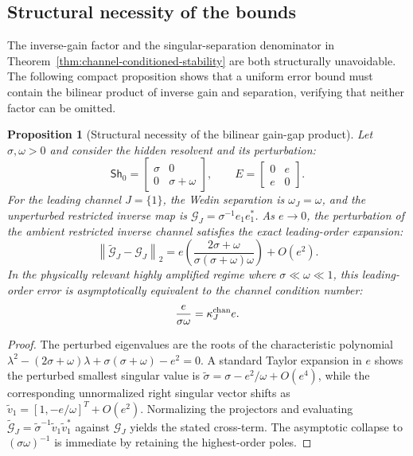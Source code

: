 \documentclass[review]{siamart220329}
\newtheorem{proposition}[theorem]{Proposition}
\theoremstyle{definition}
\theoremstyle{remark}
\newcommand{\Sh}{\mathsf{Sh}}
\newcommand{\norm}[1]{\left\lVert #1\right\rVert}
\begin{document}
\subsection{Structural necessity of the bounds}\label{sec:near-sharpness}
The inverse-gain factor and the singular-separation denominator in Theorem~\ref{thm:channel-conditioned-stability} are both structurally unavoidable. The following compact proposition shows that a uniform error bound must contain the bilinear product of inverse gain and separation, verifying that neither factor can be omitted.

\begin{proposition}[Structural necessity of the bilinear gain-gap product]
\label{prop:structural-necessity}
Let $\sigma, \omega > 0$ and consider the hidden resolvent and its perturbation:
\begin{equation}
    \Sh_0 = \begin{bmatrix} \sigma & 0 \\ 0 & \sigma+\omega \end{bmatrix},
    \qquad
    E = \begin{bmatrix} 0 & e \\ e & 0 \end{bmatrix}.
\end{equation}
For the leading channel $J=\{1\}$, the Wedin separation is $\omega_J = \omega$, and the unperturbed restricted inverse map is $\mathcal{G}_J = \sigma^{-1} e_1 e_1^*$. 
As $e \to 0$, the perturbation of the ambient restricted inverse channel satisfies the exact leading-order expansion:
\begin{equation}
    \norm{\widetilde{\mathcal{G}}_J - \mathcal{G}_J}_2 = e \left( \frac{2\sigma+\omega}{\sigma(\sigma+\omega)\omega} \right) + O(e^2).
\end{equation}
In the physically relevant highly amplified regime where $\sigma \ll \omega \ll 1$, this leading-order error is asymptotically equivalent to the channel condition number:
\begin{equation}
    \frac{e}{\sigma \omega} = \kappa_J^{\rm chan} e.
\end{equation}
\end{proposition}

\begin{proof}
The perturbed eigenvalues are the roots of the characteristic polynomial $\lambda^2 - (2\sigma+\omega)\lambda + \sigma(\sigma+\omega)-e^2=0$. A standard Taylor expansion in $e$ shows the perturbed smallest singular value is $\tilde{\sigma} = \sigma - e^2/\omega + O(e^4)$, while the corresponding unnormalized right singular vector shifts as $\tilde{v}_1 = [1, -e/\omega]^T + O(e^2)$. Normalizing the projectors and evaluating $\widetilde{\mathcal{G}}_J = \tilde{\sigma}^{-1} \tilde{v}_1 \tilde{v}_1^*$ against $\mathcal{G}_J$ yields the stated cross-term. The asymptotic collapse to $(\sigma \omega)^{-1}$ is immediate by retaining the highest-order poles.
\end{proof}
\end{document}
